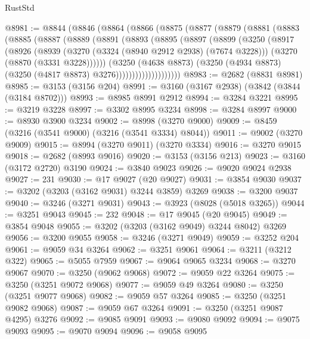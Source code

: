 \begin{lexlean}{RustStd}
\begin{coremodule}
@8981 := @8844
    (@8846
      (@8864
        (@8866
          (@8875
            (@8877
              (@8879
                (@8881
                  (@8883
                    (@8885
                      (@8887
                        (@8889
                          (@8891
                            (@8893
                              (@8895
                                (@8897
                                  (@8899
                                    (@3250
                                      (@8917
                                        (@8926
                                          (@8939
                                            (@3270 (@3324 (@8940 @2912 @2938) (@7674 @3228)))
                                            (@3270 (@8870 (@3331 @3228))))))
                                      (@3250
                                        (@4638 @8873)
                                        (@3250
                                          (@4934 @8873)
                                          (@3250 (@4817 @8873) @3276))))))))))))))))))))
@8983 := @2682 (@8831 @8981)
@8985 := @3153 (@3156 @204)
@8991 := @3160 (@3167 @2938) (@3842 (@3844 (@3184 @8702)))
@8993 := @8985 @8991 @2912
@8994 := @3284 @3221
@8995 := @3219 @3228
@8997 := @3302 @8995 @3234
@8998 := @3284 @8997
@9000 := @8930 @3900 @3234
@9002 := @8998 (@3270 @9000)
@9009 := @8459 (@3216 (@3541 @9000) (@3216 (@3541 @3334) @8044))
@9011 := @9002 (@3270 @9009)
@9015 := @8994 (@3270 @9011) (@3270 @3334)
@9016 := @3270 @9015
@9018 := @2682 (@8993 @9016)
@9020 := @3153 (@3156 @213)
@9023 := @3160 (@3172 @2720) @3190
@9024 := @3840 @9023
@9026 := @9020 @9024 @2938
@9027 := 231
@9030 := @17 @9027 (@20 @9027)
@9031 := @3854 @9030
@9037 := @3202 (@3203 (@3162 @9031) @3244 @3859) @3269
@9038 := @3200 @9037
@9040 := @3246 (@3271 @9031)
@9043 := @3923 (@8028 (@5018 @3265))
@9044 := @3251 @9043
@9045 := 232
@9048 := @17 @9045 (@20 @9045)
@9049 := @3854 @9048
@9055 := @3202 (@3203 (@3162 @9049) @3244 @8042) @3269
@9056 := @3200 @9055
@9058 := @3246 (@3271 @9049)
@9059 := @3252 @204
@9061 := @9059 @34 @3264
@9062 := @3251 @9061
@9064 := @3211 (@3212 @322)
@9065 := @5055 @7959
@9067 := @9064 @9065 @3234
@9068 := @3270 @9067
@9070 := @3250 (@9062 @9068)
@9072 := @9059 @22 @3264
@9075 := @3250 (@3251 @9072 @9068)
@9077 := @9059 @49 @3264
@9080 := @3250 (@3251 @9077 @9068)
@9082 := @9059 @57 @3264
@9085 := @3250 (@3251 @9082 @9068)
@9087 := @9059 @67 @3264
@9091 := @3250 (@3251 @9087 @4295) @3276
@9092 := @9085 @9091
@9093 := @9080 @9092
@9094 := @9075 @9093
@9095 := @9070 @9094
@9096 := @9058 @9095

\end{coremodule}
\end{lexlean}
